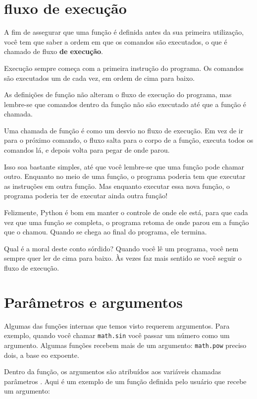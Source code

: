 \documentclass[10pt]{book}
\begin{document}
\section{fluxo de execução}

A fim de assegurar que uma função é definida antes da sua primeira utilização,
você tem que saber a ordem em que os comandos são executados, o que é
chamado de fluxo {\bf de execução}.

Execução sempre começa com a primeira instrução do programa.
Os comandos são executados um de cada vez, em ordem de cima para baixo.

As definições de função não alteram o fluxo de execução do
programa, mas lembre-se que comandos dentro da função não são
executado até que a função é chamada.

Uma chamada de função é como um desvio no fluxo de execução. Em vez de
ir para o próximo comando, o fluxo salta para o corpo de
a função, executa todos os comandos lá, e depois volta
para pegar de onde parou.

Isso soa bastante simples, até que você lembre-se que uma função pode
chamar outro. Enquanto no meio de uma função, o programa poderia
tem que executar as instruções em outra função. Mas enquanto
executar essa nova função, o programa poderia ter de executar ainda
outra função!

Felizmente, Python é bom em manter o controle de onde ele está, para que cada
vez que uma função se completa, o programa retoma de onde parou em
a função que o chamou. Quando se chega ao final do programa,
ele termina.

Qual é a moral deste conto sórdido? Quando você lê um programa, você
nem sempre quer ler de cima para baixo. Às vezes faz
mais sentido se você seguir o fluxo de execução.


\section{Parâmetros e argumentos}
\label{parâmetros}

Algumas das funções internas que temos visto requerem argumentos. Para
exemplo, quando você chamar {\tt math.sin} você passar um número
como um argumento. Algumas funções recebem mais de um argumento:
{\tt math.pow} preciso dois, a base eo expoente.

Dentro da função, os argumentos são atribuídos aos
variáveis ​​chamadas parâmetros {\bf}. Aqui é um exemplo de um
função definida pelo usuário que recebe um argumento:
\end{document}
